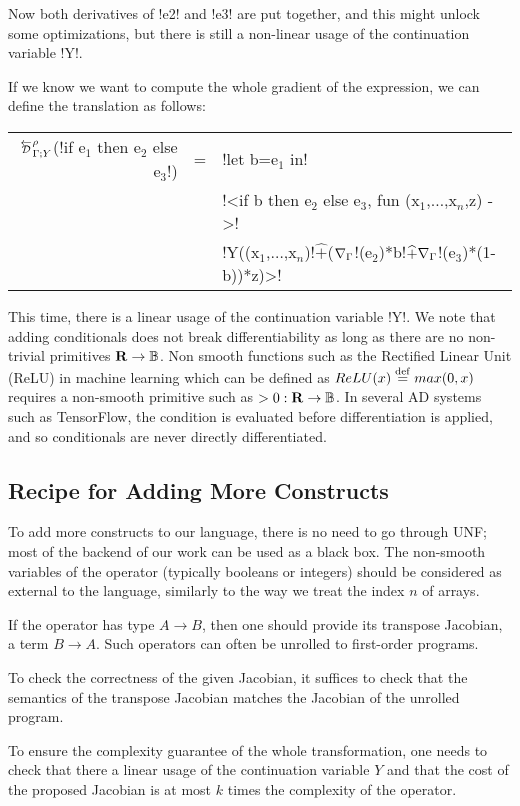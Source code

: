 Now both derivatives of !e2! and !e3! are put together, and this might unlock some optimizations, 
but there is still a non-linear usage of the continuation variable !Y!.

If we know we want to compute the whole gradient of the expression, we can define the translation as follows:

\begin{tabular}{r c l}
    $\directD{\rho}{\Gamma}{Y}$(!if e$_1$ then e$_2$ else e$_3$!) 
    &=& !let b=e$_1$ in!   \\
    && !<if b then e$_2$ else e$_3$, fun (x$_1$,$\ldots$,x$_n$,z) ->! \\
    && !Y((x$_1$,$\ldots$,x$_n$)!$\widehat{+}$($\nabla_\Gamma$!(e$_2$)*b!$\widehat{+}\nabla_\Gamma$!(e$_3$)*(1-b))*z)>!\\
\end{tabular}

This time, there is a linear usage of the continuation variable !Y!. We note that adding conditionals does not break differentiability as long as there are no non-trivial primitives $\mathbf{R}\to\mathbb{B}$.
Non smooth functions such as the Rectified Linear Unit (ReLU) in machine learning which can be defined as $ReLU(x)\stackrel {\mathrm{def}}= max(0,x)$ 
requires a non-smooth primitive such as $>0: \mathbf{R}\to\mathbb{B}$. In several AD systems such as TensorFlow, 
the condition is evaluated before differentiation is applied, and so conditionals are never directly differentiated.

\subsection{Recipe for Adding More Constructs}
\label{sub:lift_recipe}
To add more constructs to our language, 
there is no need to go through UNF; most of the backend of our work can be used as a black box.
The non-smooth variables of the operator (typically booleans or integers) should be considered as external to the language, similarly to the way we treat the index $n$ of arrays.

If the operator has type $A\to B$, then one should provide its transpose Jacobian, a term $B\to A$. 
Such operators can often be unrolled to first-order programs. 

To check the correctness of the given Jacobian, it suffices to 
check that the semantics of the transpose Jacobian matches the Jacobian of the unrolled program. 

To ensure the complexity guarantee of the whole transformation, one needs to check that there a linear usage of the continuation variable $Y$ and that the cost of the 
proposed Jacobian is at most $k$ times the complexity of the operator. 
